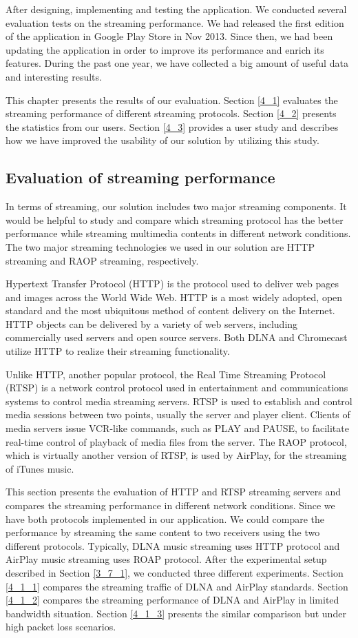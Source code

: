 
After designing, implementing and testing the application. We conducted several
evaluation tests on the streaming performance. We had released the first
edition of the application in Google Play Store in Nov 2013. Since then, we had
been updating the application in order to improve its performance and enrich
its features. During the past one year, we have collected a big amount of
useful data and interesting results.

This chapter presents the results of our evaluation. Section \ref{4_1} evaluates
the streaming performance of different streaming protocols. Section \ref{4_2}
presents the statistics from our users. Section \ref{4_3} provides a user study
and describes how we have improved the usability of our solution by utilizing
this study.
\subsection{Evaluation of streaming performance\label{4_1}}
In terms of streaming, our solution includes two major streaming components. It
would be helpful to study and compare which streaming protocol has the better
performance while streaming multimedia contents in different network conditions.
The two major streaming technologies we used in our solution are HTTP streaming
and RAOP streaming, respectively.

Hypertext Transfer Protocol (HTTP) is the protocol used to deliver web pages
and images across the World Wide Web. HTTP is a most widely adopted, open
standard and the most ubiquitous method of content delivery on the Internet.
HTTP objects can be delivered by a variety of web servers, including
commercially used servers and open source servers. Both DLNA and Chromecast utilize
HTTP to realize their streaming functionality.

Unlike HTTP, another popular protocol, the Real Time Streaming Protocol (RTSP)
is a network control protocol used in entertainment and communications systems
to control media streaming servers. RTSP is used to establish and control media
sessions between two points, usually the server and player client. Clients of
media servers issue VCR-like commands, such as PLAY and PAUSE, to facilitate
real-time control of playback of media files from the server.  The RAOP
protocol, which is virtually another version of RTSP, is used by AirPlay, for
the streaming of iTunes music.

This section presents the evaluation of HTTP and RTSP streaming servers and compares the streaming performance in different network conditions. Since we have both protocols implemented in our application. We could compare the performance by streaming the same content to two receivers using the two different protocols. Typically, DLNA music streaming uses HTTP protocol and AirPlay music streaming uses ROAP protocol. After the experimental setup described in Section \ref{3_7_1}, we conducted three different experiments. Section \ref{4_1_1} compares the streaming traffic of DLNA and AirPlay standards. Section \ref{4_1_2} compares the streaming performance of DLNA and AirPlay in limited bandwidth situation. Section \ref{4_1_3} presents the similar comparison but under high packet loss scenarios.
